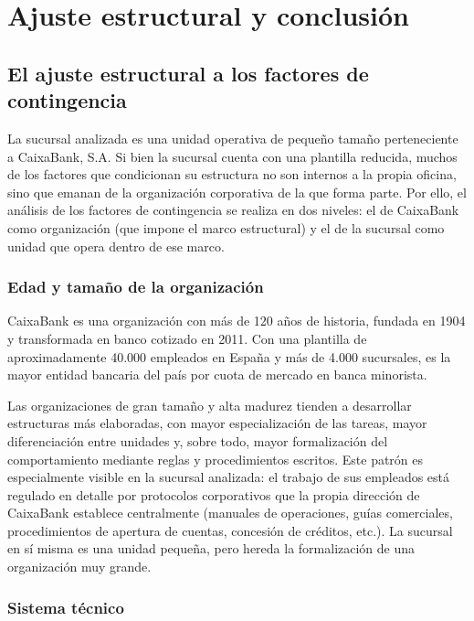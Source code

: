 
\chapter{Ajuste estructural y conclusión}

\section{El ajuste estructural a los factores de contingencia}

La sucursal analizada es una unidad operativa de pequeño tamaño perteneciente a CaixaBank,
S.A. Si bien la sucursal cuenta con una plantilla reducida, muchos de los factores que
condicionan su estructura no son internos a la propia oficina, sino que emanan de la
organización corporativa de la que forma parte. Por ello, el análisis de los factores
de contingencia se realiza en dos niveles: el de CaixaBank como organización (que impone
el marco estructural) y el de la sucursal como unidad que opera dentro de ese marco.

\subsection{Edad y tamaño de la organización}

CaixaBank es una organización con más de 120 años de historia, fundada en 1904 y
transformada en banco cotizado en 2011. Con una plantilla de aproximadamente 40.000
empleados en España y más de 4.000 sucursales, es la mayor entidad bancaria del país por
cuota de mercado en banca minorista.

Las organizaciones de gran tamaño y alta madurez tienden a desarrollar estructuras más
elaboradas, con mayor especialización de las tareas, mayor diferenciación entre unidades
y, sobre todo, mayor formalización del comportamiento mediante reglas y procedimientos
escritos. Este patrón es especialmente visible en la sucursal analizada: el trabajo de
sus empleados está regulado en detalle por protocolos corporativos que la propia dirección
de CaixaBank establece centralmente (manuales de operaciones, guías comerciales,
procedimientos de apertura de cuentas, concesión de créditos, etc.). La sucursal en sí
misma es una unidad pequeña, pero hereda la formalización de una organización muy grande.

\subsection{Sistema técnico}

